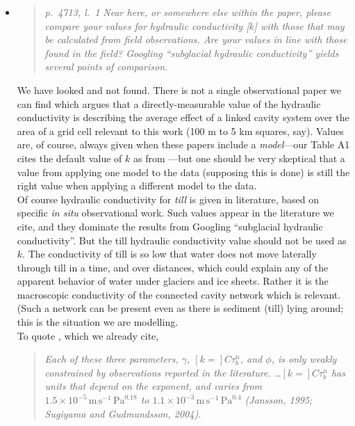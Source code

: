 \documentclass[11pt,reqno]{amsart}
\newcommand{\reply}[2]{
\medskip\medskip
\item  \begin{quote}
\emph{#1}
\end{quote}

\medskip
\noindent #2}
\begin{document}
\begin{itemize}
\reply{p.~4713, l.~1 Near here, or somewhere else within the paper, please compare your
values for hydraulic conductivity [$k$] with those that may be calculated from field observations. Are your values in line with those found in the field? Googling ``subglacial
hydraulic conductivity'' yields several points of comparison.}
{We have looked and not found.  There is not a single observational paper we can find which argues that a directly-measurable value of the hydraulic conductivity is describing the average effect of a linked cavity system over the area of a grid cell relevant to this work (100 m to 5 km squares, say).  Values are, of course, always given when these papers include a \emph{model}---our Table A1 cites the default value of $k$ as from \cite{Schoofetal2012}---but one should be very skeptical that a value from applying one model to the data (supposing this is done) is still the right value when applying a different model to the data. \\
\indent Of course hydraulic conductivity for \emph{till} is given in literature, based on specific \emph{in situ} observational work.  Such values appear in the literature we cite, and they dominate the results from Googling ``subglacial hydraulic conductivity''.  But the till hydraulic conductivity value should not be used as $k$.  The conductivity of till is so low that water does not move laterally through till in a time, and over distances, which could explain any of the apparent behavior of water under glaciers and ice sheets.  Rather it is the macroscopic conductivity of the connected cavity network which is relevant.  (Such a network can be present even as there is sediment (till) lying around; this is the situation we are modelling. \\
\indent  To quote \cite{Bartholomausetal2011}, which we already cite, \begin{quote}
\emph{Each of these three parameters, $\gamma$, $[k=]C\tau_b^n$, and $\phi$, is only weakly constrained by observations reported in the literature.  \dots $[k=]C\tau_b^n$ has units that depend on the exponent, and varies from $1.5\times 10^{-5}\, \text{m}\,\text{s}^{-1}\,\text{Pa}^{0.18}$ to $1.1\times 10^{-3}\, \text{m}\,\text{s}^{-1}\,\text{Pa}^{0.4}$ (Jansson, 1995; Sugiyama and Gudmundsson, 2004).}
\end{quote}
}
\end{itemize}
\end{document}
